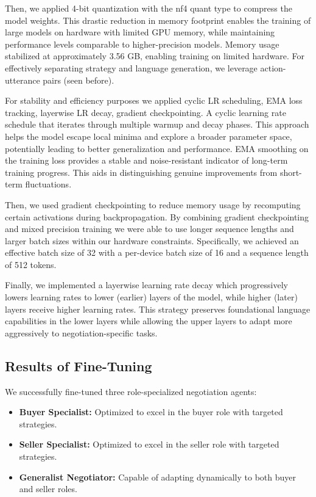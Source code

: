 \documentclass[11pt]{article}
\begin{document}
Then, we applied 4-bit quantization with the nf4 quant type to compress the model weights. This drastic reduction in memory footprint enables the training of large models on hardware with limited GPU memory, while maintaining performance levels comparable to higher-precision models.
Memory usage stabilized at approximately 3.56 GB, enabling training on limited hardware. For effectively separating strategy and language generation, we leverage action-utterance pairs (seen before).

For stability and efficiency purposes we applied cyclic LR scheduling, EMA loss tracking, layerwise LR decay, gradient checkpointing. A cyclic learning rate schedule that iterates through multiple warmup and decay phases. This approach helps the model escape local minima and explore a broader parameter space, potentially leading to better generalization and performance. EMA smoothing on the training loss provides a stable and noise-resistant indicator of long-term training progress. This aids in distinguishing genuine improvements from short-term fluctuations. 

Then, we used gradient checkpointing to reduce memory usage by recomputing certain activations during backpropagation. By combining gradient checkpointing and mixed precision training we were able to use longer sequence lengths and larger batch sizes within our hardware constraints. Specifically, we achieved an effective batch size of 32 with a per-device batch size of 16 and a sequence length of 512 tokens.

Finally, we implemented a layerwise learning rate decay which progressively lowers learning rates to lower (earlier) layers of the model, while higher (later) layers receive higher learning rates. This strategy preserves foundational language capabilities in the lower layers while allowing the upper layers to adapt more aggressively to negotiation-specific tasks. 


\subsection{Results of Fine-Tuning}
We successfully fine-tuned three role-specialized negotiation agents:
\begin{itemize}
    \item \textbf{Buyer Specialist:} Optimized to excel in the buyer role with targeted strategies.
    \item \textbf{Seller Specialist:} Optimized to excel in the seller role with targeted strategies.
    \item \textbf{Generalist Negotiator:} Capable of adapting dynamically to both buyer and seller roles.
\end{itemize}
\end{document}
